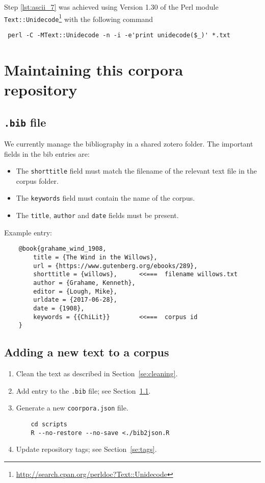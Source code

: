 \documentclass[a4paper,10pt]{paper}
\begin{document}
Step \ref{lst:ascii_7} was achieved using Version 1.30 of the Perl module \texttt{Text::Unidecode}\footnote{\url{http://search.cpan.org/perldoc?Text::Unidecode}} with the following command
\begin{verbatim} perl -C -MText::Unidecode -n -i -e'print unidecode($_)' *.txt \end{verbatim}

\section{Maintaining this corpora repository}
\subsection{\texttt{.bib} file} \label{se:bib_file}
We currently manage the bibliography in a shared zotero folder.
The important fields in the bib entries are:
\begin{itemize}
    \item The \texttt{shorttitle} field must match the filename of the relevant text file in the corpus folder.
    \item The \texttt{keywords} field must contain the name of the corpus.
    \item The \texttt{title}, \texttt{author} and \texttt{date} fields must be present.
\end{itemize}    
Example entry:
\begin{verbatim}
    @book{grahame_wind_1908,
        title = {The Wind in the Willows},
        url = {https://www.gutenberg.org/ebooks/289},
        shorttitle = {willows},      <<===  filename willows.txt
        author = {Grahame, Kenneth},
        editor = {Lough, Mike},
        urldate = {2017-06-28},
        date = {1908},
        keywords = {{ChiLit}}        <<===  corpus id
    }
\end{verbatim}
\subsection{Adding a new text to a corpus} \label{se:add_file}
\begin{enumerate}
    \item Clean the text as described in Section~\ref{se:cleaning}.
    \item Add entry to the \texttt{.bib} file; see Section~\ref{se:bib_file}. 
    \item Generate a new \texttt{coorpora.json} file.
        \begin{verbatim}
    cd scripts
    R --no-restore --no-save <./bib2json.R \end{verbatim}
    \item Update repository tags; see Section~\ref{se:tags}.
\end{enumerate}
\end{document}
